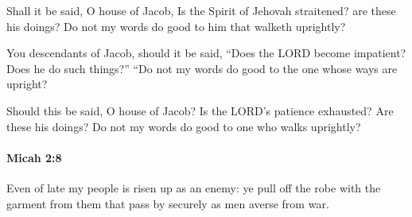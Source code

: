 			\begin{versebox}
					\item[BHS] 
					\item[LXX] 
					\item[ASV] Shall it be said, O house of Jacob, Is the Spirit of Jehovah straitened? are these his doings? Do not my words do good to him that walketh uprightly?
					\item[NIV] You descendants of Jacob, should it be said, “Does the LORD become impatient? Does he do such things?” “Do not my words do good to the one whose ways are upright?
					\item[NRSV] Should this be said, O house of Jacob? Is the LORD’s patience exhausted? Are these his doings? Do not my words do good to one who walks uprightly?
			\end{versebox}

		\paragraph{Micah 2:8} %
			\label{MICAH-2-8}

			Even of late my people is risen up as an enemy: ye pull off the robe with the garment from them that pass by securely as men averse from war.

